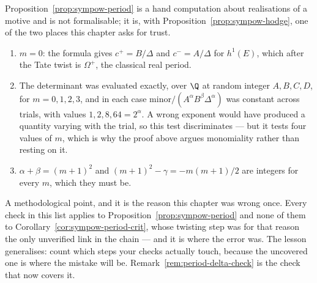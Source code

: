 \begin{remark}
  \label{rem:period-checked}
  Proposition~\ref{prop:sympow-period} is a hand computation about realisations of a motive
  and is not formalisable; it is, with Proposition~\ref{prop:sympow-hodge}, one of the two
  places this chapter asks for trust.
  \begin{enumerate}
    \item $m=0$: the formula gives $c^{+}=B/\Delta$ and $c^{-}=A/\Delta$ for $h^{1}(E)$,
      which after the Tate twist is $\Omega^{+}$, the classical real period.
    \item The determinant was evaluated exactly, over $\Q$ at random integer $A,B,C,D$, for
      $m=0,1,2,3$, and in each case $\mathrm{minor}/(A^{\alpha}B^{\beta}\Delta^{\alpha})$ was
      constant across trials, with values $1, 2, 8, 64 = 2^{\alpha}$. A wrong exponent would
      have produced a quantity varying with the trial, so this test discriminates --- but it
      tests four values of $m$, which is why the proof above argues monomiality rather than
      resting on it.
    \item $\alpha + \beta = (m+1)^{2}$ and $(m+1)^{2} - \gamma = -m(m+1)/2$ are integers for
      every $m$, which they must be.
  \end{enumerate}

  A methodological point, and it is the reason this chapter was wrong once. Every check in
  this list applies to Proposition~\ref{prop:sympow-period} and none of them to
  Corollary~\ref{cor:sympow-period-crit}, whose twisting step was for that reason the only
  unverified link in the chain --- and it is where the error was. The lesson generalises:
  count which steps your checks actually touch, because the uncovered one is where the
  mistake will be. Remark~\ref{rem:period-delta-check} is the check that now covers it.
\end{remark}

